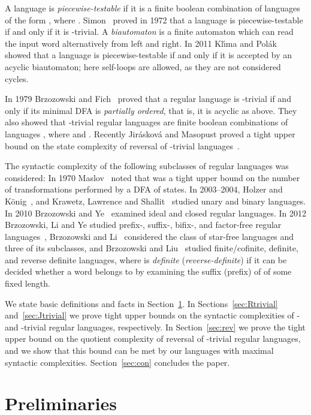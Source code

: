 \documentclass{llncs}
\begin{document}
A language  is \emph{piecewise-testable} if it is a finite boolean combination of languages of the form , where . Simon~\cite{Sim72,Sim75} proved in 1972 that a language is piecewise-testable if and only if it is -trivial. A \emph{biautomaton} is a finite automaton which can read the input word alternatively from left and  right. In 2011 Kl\'{\i}ma and Pol{\'a}k~\cite{KP11} showed that a language is piecewise-testable if and only if it is accepted by an acyclic biautomaton; here self-loops are allowed, as they are not considered cycles. 

In 1979 Brzozowski and Fich~\cite{BrFi80} proved that a regular language is -trivial if and only if its minimal DFA is \emph{partially ordered}, that is, it is acyclic as above. They also showed that -trivial regular languages are  finite boolean combinations of languages , where  and . Recently Jir{\'a}skov{\'a} and Masopust proved a tight upper bound on the state complexity of reversal of -trivial languages~\cite{JiMa12}. 

The syntactic complexity of the following subclasses of regular languages was considered: In 1970 Maslov~\cite{Mas70} noted that  was a tight upper bound on the number of transformations performed by a DFA of  states. In 2003--2004, Holzer and K\"onig~\cite{HoKo04}, and Krawetz, Lawrence and Shallit~\cite{KLS03} studied unary and binary languages. In 2010 Brzozowski and Ye~\cite{BrYe11} examined ideal and closed regular languages. In 2012 Brzozowski, Li and Ye studied prefix-, suffix-, bifix-, and factor-free regular languages~\cite{BLY12}, Brzozowski and Li~\cite{BL12a} considered the class of star-free languages and three of its subclasses, and Brzozowski and Liu~\cite{BrLiu12} studied finite/cofinite, definite, and reverse definite languages, where 
 is \emph{definite} (\emph{reverse-definite}) if it can be decided whether a word  belongs to  by examining the suffix (prefix) of  of some fixed length.

We state basic definitions and facts in Section~\ref{sec:pre}. In Sections~\ref{sec:Rtrivial} and~\ref{sec:Jtrivial} we prove tight upper bounds on the syntactic complexities of - and -trivial regular languages, respectively. 
In Section~\ref{sec:rev} we prove the tight upper bound on the quotient complexity of reversal of -trivial regular languages, and we show that this bound can be met by our languages with maximal syntactic complexities. 
Section~\ref{sec:con} concludes the paper. 


\section{Preliminaries}\label{sec:pre}
\end{document}
